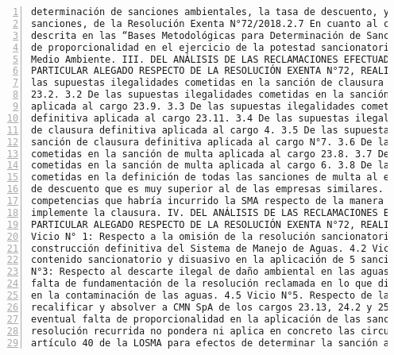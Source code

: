 \begin{Verbatim}[frame=lines, label=Elavoración propia -  Ejemplo de Contexto enviado por el Chatbot a OpenAI
				, fontsize=\scriptsize, numbers=left
				, baselinestretch=0.4
				, formatcom=\color{gray}]
determinación de sanciones ambientales, la tasa de descuento, y la proporcionalidad de las
sanciones, de la Resolución Exenta N°72/2018.2.7 En cuanto al cálculo de la Tasa de Descuento
descrita en las “Bases Metodológicas para Determinación de Sanciones Ambientales”. El estándar
de proporcionalidad en el ejercicio de la potestad sancionatoria de la Superintendencia del
Medio Ambiente. III. DEL ANÁLISIS DE LAS RECLAMACIONES EFECTUADAS PARA CADA CARGO EN
PARTICULAR ALEGADO RESPECTO DE LA RESOLUCIÓN EXENTA N°72, REALIZADO EN CAUSA R-5-2018. 3.1 De
las supuestas ilegalidades cometidas en la sanción de clausura definitiva aplicada al cargo
23.2. 3.2 De las supuestas ilegalidades cometidas en la sanción de clausura definitiva
aplicada al cargo 23.9. 3.3 De las supuestas ilegalidades cometidas en la sanción de clausura
definitiva aplicada al cargo 23.11. 3.4 De las supuestas ilegalidades cometidas en la sanción
de clausura definitiva aplicada al cargo 4. 3.5 De las supuestas ilegalidades cometidas en la
sanción de clausura definitiva aplicada al cargo N°7. 3.6 De las supuestas ilegalidades
cometidas en la sanción de multa aplicada al cargo 23.8. 3.7 De las supuestas ilegalidades
cometidas en la sanción de multa aplicada al cargo 6. 3.8 De las supuestas ilegalidades
cometidas en la definición de todas las sanciones de multa al establecer un criterio de tasa
de descuento que es muy superior al de las empresas similares. 3.9 Del supuesto exceso en las
competencias que habría incurrido la SMA respecto de la manera en que pretende que se
implemente la clausura. IV. DEL ANÁLISIS DE LAS RECLAMACIONES EFECTUADAS PARA CADA CARGO EN
PARTICULAR ALEGADO RESPECTO DE LA RESOLUCIÓN EXENTA N°72, REALIZADO EN CAUSA R-6-2018. 4.1
Vicio N° 1: Respecto a la omisión de la resolución sancionatoria de ordenar a CMN SpA la
construcción definitiva del Sistema de Manejo de Aguas. 4.2 Vicio N°2: Sobre la falta de
contenido sancionatorio y disuasivo en la aplicación de 5 sanciones de clausura. 4.3 Vicio
N°3: Respecto al descarte ilegal de daño ambiental en las aguas. 4.4 Vicio N°4: De la supuesta
falta de fundamentación de la resolución reclamada en lo que dice relación con la causalidad
en la contaminación de las aguas. 4.5 Vicio N°5. Respecto de la motivación de la SMA para
recalificar y absolver a CMN SpA de los cargos 23.13, 24.2 y 25. 4.6 Vicio N°6: Sobre la
eventual falta de proporcionalidad en la aplicación de las sanciones. 4.7 Vicio N°7: La
resolución recurrida no pondera ni aplica en concreto las circunstancias que contempla el
artículo 40 de la LOSMA para efectos de determinar la sanción a aplicar a cada infracción. 4.8

\end{Verbatim}
